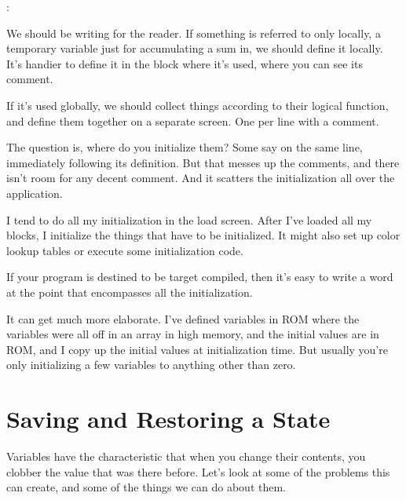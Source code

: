\begin{interview}%
:

\begin{tfquot}
We should be writing for the reader. If something is referred to only
locally, a temporary variable just for accumulating a sum in, we should
define it locally. It's handier to define it in the block where it's used,
where you can see its comment.

If it's used globally, we should collect things according to their logical
function, and define them together on a separate screen. One per line with
a comment.

The question is, where do you initialize them? Some say on the same line,
immediately following its definition. But that messes up the comments, and
there isn't room for any decent comment. And it scatters the
initialization all over the application.

I tend to do all my initialization in the load screen. After I've loaded
all my blocks, I initialize the things that have to be initialized. It
might also set up color lookup tables or execute some initialization code.

If your program is destined to be target compiled, then it's easy to write
a word at the point that encompasses all the initialization.

It can get much more elaborate. I've defined variables in ROM where the
variables were all off in an array in high memory, and the initial values are
in ROM, and I copy up the initial values at initialization time. But usually
you're only initializing a few variables to anything other than zero.
\end{tfquot}%
\end{interview}%
%
%
%
%

\section{Saving and Restoring a State}%
%

Variables have the characteristic that when you change their contents,
you clobber the value that was there before. Let's look at some of the
problems this can create, and some of the things we can do about them.

